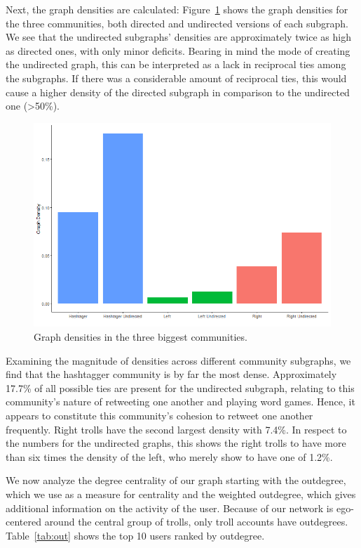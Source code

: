 \documentclass[12pt, titlepage=true, toc=bib]{scrartcl}
\begin{document}
Next, the graph densities are calculated: Figure~\ref{fig:dens} shows the graph densities for the three communities, both directed and undirected versions of each subgraph. We see that the undirected subgraphs' densities are approximately twice as high as directed ones, with only minor deficits. Bearing in mind the mode of creating the undirected graph, this can be interpreted as a lack in reciprocal ties among the subgraphs. If there was a considerable amount of reciprocal ties, this would cause a higher density of the directed subgraph in comparison to the undirected one (>50\%).

\begin{figure}[!ht]
\centering
\includegraphics[width=0.95\linewidth]{final_figure3.png}
\caption[Graph densities]{Graph densities in the three biggest communities.}
\label{fig:dens}
\end{figure}

Examining the magnitude of densities across different community subgraphs, we find that the hashtagger community is by far the most dense. Approximately 17.7\% of all possible ties are present for the undirected subgraph, relating to this community's nature of retweeting one another and playing word games. Hence, it appears to constitute this community's cohesion to retweet one another frequently. Right trolls have the second largest density with 7.4\%. In respect to the numbers for the undirected graphs, this shows the right trolls to have more than six times the density of the left, who merely show to have one of 1.2\%.

We now analyze the degree centrality of our graph starting with the outdegree, which we use as a measure for centrality and the weighted outdegree, which gives additional information on the activity of the user. Because of our network is ego-centered around the central group of trolls, only troll accounts have outdegrees. Table~\ref{tab:out} shows the top 10 users ranked by outdegree.
\end{document}
